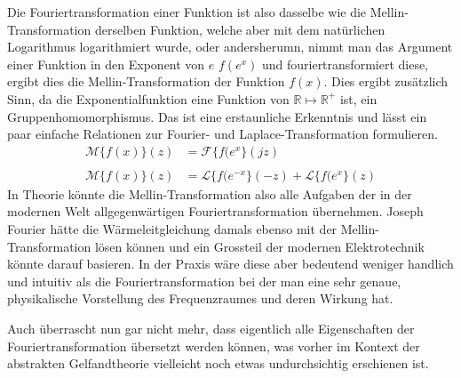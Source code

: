 Die Fouriertransformation einer Funktion ist also dasselbe wie die Mellin-Transformation derselben Funktion, welche aber
mit dem natürlichen Logarithmus logarithmiert wurde, oder andersherumn, nimmt man das Argument einer Funktion 
in den Exponent von $e$ $f(e^x)$ und fouriertransformiert diese, ergibt dies die Mellin-Transformation der Funktion $f(x)$.
Dies ergibt zusätzlich Sinn, da die Exponentialfunktion eine Funktion von $\mathbb{R} \mapsto \mathbb{R^+}$ ist, ein 
Gruppenhomomorphismus.
Das ist eine erstaunliche Erkenntnis und lässt ein paar einfache Relationen zur Fourier- und Laplace-Transformation 
formulieren.
\begin{align*}
    \mathcal{M}\{f(x)\}(z) &= \mathcal{F}\{f (e^{x}\}(jz) \\ \\
    \mathcal{M}\{f(x)\}(z) &= \mathcal{L}\{f (e^{-x}\}(-z) + \mathcal{L}\{f (e^{x}\}(z) 
\end{align*}
In Theorie könnte die Mellin-Transformation also alle Aufgaben der in der modernen Welt allgegenwärtigen Fouriertransformation 
übernehmen.
Joseph Fourier hätte die Wärmeleitgleichung damals ebenso mit der Mellin-Transformation lösen können und ein Grossteil der modernen 
Elektrotechnik könnte darauf basieren. 
In der Praxis wäre diese aber bedeutend weniger handlich und intuitiv als die Fouriertransformation bei der man eine sehr genaue, 
physikalische Vorstellung des Frequenzraumes und deren Wirkung hat. 

Auch überrascht nun gar nicht mehr, dass eigentlich alle Eigenschaften der Fouriertransformation übersetzt werden können, 
was vorher im Kontext der abstrakten Gelfandtheorie vielleicht noch etwas undurchsichtig erschienen ist.
